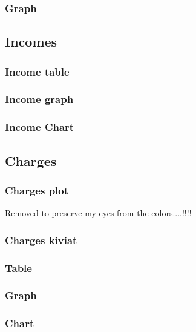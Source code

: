 \documentclass[8pt]{article} %
\begin{document}
\subsubsection{Graph}
%
%

\subsection{Incomes}
%

\subsubsection{Income table}

\subsubsection{Income graph}

\subsubsection{Income Chart}


\subsection{Charges}


\subsubsection{Charges plot}
Removed to preserve my eyes from the colors....!!!!\\

\subsubsection{Charges kiviat}


\subsubsection{Table}


\subsubsection{Graph}


\subsubsection{Chart}
\end{document}
